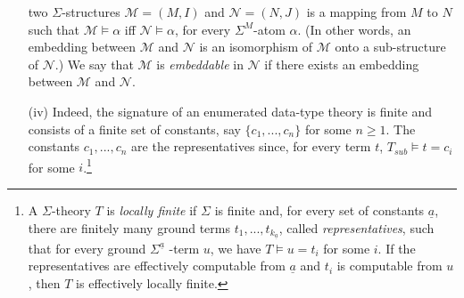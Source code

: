 \documentclass[conference]{IEEEtran}
\begin{document}
\begin{LONG}
\begin{IEEEproof}
\begin{itemize}
{        two $\Sigma$-structures $\mathcal{M}=(M,{I})$ and
        $\mathcal{N}=(N,{J})$ is a mapping from $M$ to $N$ such that
        $\mathcal{M} \models \alpha$ iff $\mathcal{N} \models \alpha$,
        for every $\Sigma^{M}$-atom $\alpha$.  (In other words, an
        embedding between $\mathcal{M}$ and $\mathcal{N}$ is an
        isomorphism of $\mathcal{M}$ onto a sub-structure of
        $\mathcal{N}$.)  We say that $\mathcal{M}$ is \emph{embeddable} in
        $\mathcal{N}$ if there exists an embedding between
        $\mathcal{M}$ and $\mathcal{N}$.}
    \item[(iv)] Indeed, the signature of an enumerated data-type
      theory is finite and consists of a finite set of constants, say
      $\{c_1, ..., c_n\}$ for some $n\geq 1$.  The constants $c_1,
      ..., c_n$ are the representatives since, for every term $t$,
      $T_\mathit{sub}\models t=c_i$ for some $i$.\footnote{A $\Sigma$-theory
        $T$ is \emph{locally finite} if $\Sigma$ is finite and, for every set
        of constants $\underline{a}$, there are finitely many ground
        terms $t_1, ..., t_{k_{\underline{a}}}$, called
        \emph{representatives}, such that for every ground
        $\Sigma^{\underline{a}}$ -term $u$, we have $T\models u = t_i$
        for some $i$.  If the representatives are effectively
        computable from $\underline{a}$ and $t_i$ is computable from
        $u$, then $T$ is effectively locally finite.}   
  \end{itemize}
\end{IEEEproof}


\end{LONG}
\end{document}
